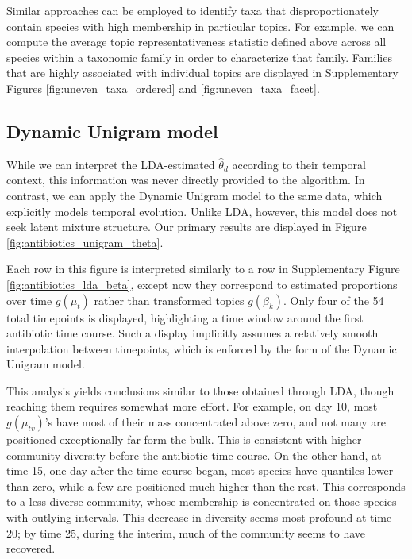 \documentclass[oupdraft]{bio}
\begin{document}
Similar approaches can be employed to identify taxa that disproportionately
contain species with high membership in particular topics. For example, we can
compute the average topic representativeness statistic defined above across all
species within a taxonomic family in order to characterize that family. Families
that are highly associated with individual topics are displayed in Supplementary
Figures \ref{fig:uneven_taxa_ordered} and \ref{fig:uneven_taxa_facet}.

\subsection{Dynamic Unigram model}
\label{sec:antibiotics_unigram}

While we can interpret the LDA-estimated $\hat{\theta}_{d}$ according to their
temporal context, this information was never directly provided to the algorithm.
In contrast, we can apply the Dynamic Unigram model to the same data, which
explicitly models temporal evolution. Unlike LDA, however, this model does not
seek latent mixture structure. Our primary results are displayed in Figure
\ref{fig:antibiotics_unigram_theta}.

Each row in this figure is interpreted similarly to a row in Supplementary
Figure \ref{fig:antibiotics_lda_beta}, except now they correspond to estimated
proportions over time $g\left(\mu_{t}\right)$ rather than transformed topics
$g\left(\beta_{k}\right)$. Only four of the 54 total timepoints is displayed,
highlighting a time window around the first antibiotic time course. Such a
display implicitly assumes a relatively smooth interpolation between timepoints,
which is enforced by the form of the Dynamic Unigram model.

This analysis yields conclusions similar to those obtained through LDA, though
reaching them requires somewhat more effort. For example, on day 10, most
$g\left(\mu_{tv}\right)$'s have most of their mass concentrated above zero, and
not many are positioned exceptionally far form the bulk. This is consistent with
higher community diversity before the antibiotic time course. On the other hand,
at time 15, one day after the time course began, most species have quantiles
lower than zero, while a few are positioned much higher than the rest. This
corresponds to a less diverse community, whose membership is concentrated on
those species with outlying intervals. This decrease in diversity seems most
profound at time 20; by time 25, during the interim, much of the community seems
to have recovered.
\end{document}
